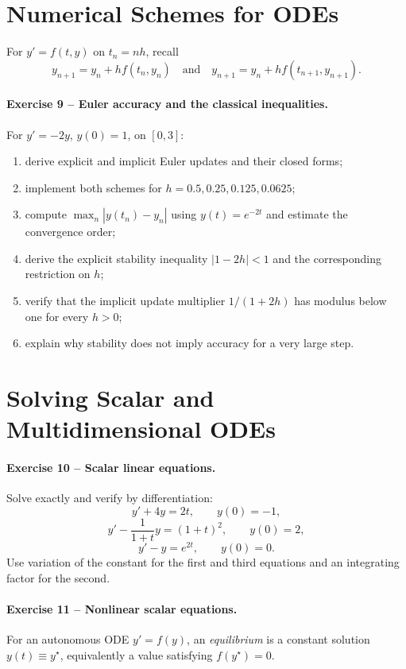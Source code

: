 \documentclass[10pt]{article}
\begin{document}
\section{Numerical Schemes for ODEs}

For $y'=f(t,y)$ on $t_n=nh$, recall
\[
y_{n+1}=y_n+hf(t_n,y_n)
\quad\text{and}\quad
y_{n+1}=y_n+hf(t_{n+1},y_{n+1}).
\]

\paragraph{Exercise 9 -- Euler accuracy and the classical inequalities.}
For $y'=-2y$, $y(0)=1$, on $[0,3]$:
\begin{enumerate}
\item derive explicit and implicit Euler updates and their closed forms;
\item implement both schemes for $h=0.5,0.25,0.125,0.0625$;
\item compute
$\max_n|y(t_n)-y_n|$ using $y(t)=e^{-2t}$ and estimate the convergence order;
\item derive the explicit stability inequality
$|1-2h|<1$ and the corresponding restriction on $h$;
\item verify that the implicit update multiplier $1/(1+2h)$ has modulus
below one for every $h>0$;
\item explain why stability does not imply accuracy for a very large step.
\end{enumerate}

\section{Solving Scalar and Multidimensional ODEs}

\paragraph{Exercise 10 -- Scalar linear equations.}
Solve exactly and verify by differentiation:
\[
y'+4y=2t,\qquad y(0)=-1,
\]
\[
y'-\frac{1}{1+t}y=(1+t)^2,\qquad y(0)=2,
\]
\[
y'-y=e^{2t},\qquad y(0)=0.
\]
Use variation of the constant for the first and third equations and an
integrating factor for the second.

\paragraph{Exercise 11 -- Nonlinear scalar equations.}
For an autonomous ODE $y'=f(y)$, an \emph{equilibrium} is a constant solution
$y(t)\equiv y^\star$, equivalently a value satisfying $f(y^\star)=0$.
\end{document}
